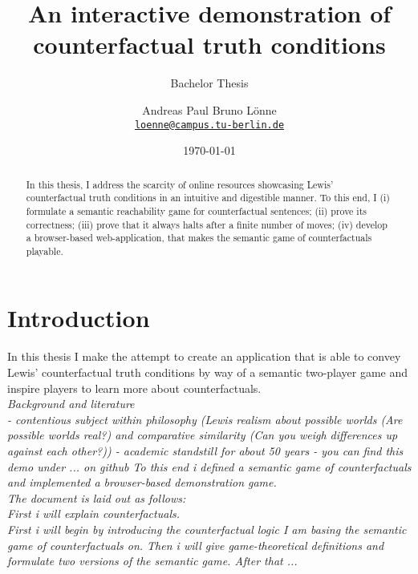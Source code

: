 \documentclass[a4paper,american]{paper}
\date{\today}
\providecommand*{\code}[1]{\texttt{#1}}
\theoremstyle{definition}\newtheorem{definition}{Definition}
\begin{document}
\title{An interactive demonstration of counterfactual truth conditions}

\subtitle{Bachelor Thesis}

\author{%
	Andreas Paul Bruno Lönne\\
	\code{\href{mailto:loenne@campus.tu-berlin.de}{loenne@campus.tu-berlin.de}}
}


\maketitle

\begin{abstract}
In this thesis, I address the scarcity of online resources showcasing Lewis' counterfactual truth conditions in an intuitive and digestible manner. To this end, I (i) formulate a semantic reachability game for counterfactual sentences; (ii) prove its correctness; (iii) prove that it always halts after a finite number of moves; (iv) develop a browser-based web-application, that makes the semantic game of counterfactuals playable.
\end{abstract}
\section{Introduction}
In this thesis I make the attempt to create an application that is able to convey Lewis' counterfactual truth conditions by way of a semantic two-player game and inspire players to learn more about counterfactuals.\\
\textit{Background and literature\\
- contentious subject within philosophy (Lewis realism about possible worlds (Are possible worlds real?) and comparative similarity (Can you weigh differences up against each other?))
- academic standstill for about 50 years
- you can find this demo under ... on github
To this end i defined a semantic game of counterfactuals and implemented a browser-based demonstration game.\\
The document is laid out as follows:\\
First i will explain counterfactuals.\\
First i will begin by introducing the counterfactual logic I am basing the semantic game of counterfactuals on. Then i will give game-theoretical definitions and formulate two versions of the semantic game. After that ...}
\end{document}
